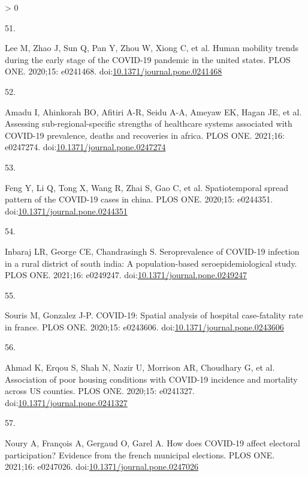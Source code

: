 \documentclass[10pt,letterpaper]{article}
\newlength{\csllabelwidth}
\newlength{\cslhangindent}
\newenvironment{CSLReferences}[3] %
 {%
  \setlength{\parindent}{0pt}
  \ifodd #1 \everypar{\setlength{\hangindent}{\cslhangindent}}\ignorespaces\fi
  \ifnum #2 > 0
  \setlength{\parskip}{#2\baselineskip}
  \fi
 }%
 {}
\newcommand{\CSLLeftMargin}[1]{\parbox[t]{\csllabelwidth}{#1}}
\newcommand{\CSLRightInline}[1]{\parbox[t]{\linewidth - \csllabelwidth}{#1}}
\begin{document}
\begin{CSLReferences}{0}{0}
\leavevmode\hypertarget{ref-Lee2020human}{}%
\CSLLeftMargin{51. }
\CSLRightInline{Lee M, Zhao J, Sun Q, Pan Y, Zhou W, Xiong C, et al.
Human mobility trends during the early stage of the COVID-19 pandemic in
the united states. PLOS ONE. 2020;15: e0241468.
doi:\href{https://doi.org/10.1371/journal.pone.0241468}{10.1371/journal.pone.0241468}}

\leavevmode\hypertarget{ref-Amadu2021assessing}{}%
\CSLLeftMargin{52. }
\CSLRightInline{Amadu I, Ahinkorah BO, Afitiri A-R, Seidu A-A, Ameyaw
EK, Hagan JE, et al. Assessing sub-regional-specific strengths of
healthcare systems associated with COVID-19 prevalence, deaths and
recoveries in africa. PLOS ONE. 2021;16: e0247274.
doi:\href{https://doi.org/10.1371/journal.pone.0247274}{10.1371/journal.pone.0247274}}

\leavevmode\hypertarget{ref-Feng2020spread}{}%
\CSLLeftMargin{53. }
\CSLRightInline{Feng Y, Li Q, Tong X, Wang R, Zhai S, Gao C, et al.
Spatiotemporal spread pattern of the COVID-19 cases in china. PLOS ONE.
2020;15: e0244351.
doi:\href{https://doi.org/10.1371/journal.pone.0244351}{10.1371/journal.pone.0244351}}

\leavevmode\hypertarget{ref-Inbaraj2021seroprevalence}{}%
\CSLLeftMargin{54. }
\CSLRightInline{Inbaraj LR, George CE, Chandrasingh S. Seroprevalence of
COVID-19 infection in a rural district of south india: A
population-based seroepidemiological study. PLOS ONE. 2021;16: e0249247.
doi:\href{https://doi.org/10.1371/journal.pone.0249247}{10.1371/journal.pone.0249247}}

\leavevmode\hypertarget{ref-Souris2020covid}{}%
\CSLLeftMargin{55. }
\CSLRightInline{Souris M, Gonzalez J-P. COVID-19: Spatial analysis of
hospital case-fatality rate in france. PLOS ONE. 2020;15: e0243606.
doi:\href{https://doi.org/10.1371/journal.pone.0243606}{10.1371/journal.pone.0243606}}

\leavevmode\hypertarget{ref-Ahmad2020association}{}%
\CSLLeftMargin{56. }
\CSLRightInline{Ahmad K, Erqou S, Shah N, Nazir U, Morrison AR,
Choudhary G, et al. Association of poor housing conditions with COVID-19
incidence and mortality across US counties. PLOS ONE. 2020;15: e0241327.
doi:\href{https://doi.org/10.1371/journal.pone.0241327}{10.1371/journal.pone.0241327}}

\leavevmode\hypertarget{ref-Noury2021how}{}%
\CSLLeftMargin{57. }
\CSLRightInline{Noury A, François A, Gergaud O, Garel A. How does
COVID-19 affect electoral participation? Evidence from the french
municipal elections. PLOS ONE. 2021;16: e0247026.
doi:\href{https://doi.org/10.1371/journal.pone.0247026}{10.1371/journal.pone.0247026}}


\end{CSLReferences}
\end{document}
